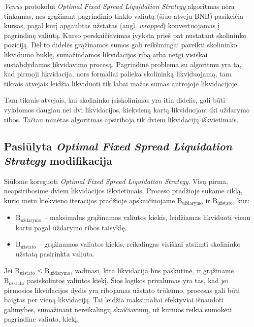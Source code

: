 \documentclass{VUMIFPSkursinis}
\begin{document}
\textit{Venus} protokolui \textit{Optimal Fixed Spread Liquidation Strategy} algoritmas nėra tinkamas, nes grąžinant pagrindinio tinklo valiutą (šiuo atveju BNB) pasikeičia kursas, pagal kurį apgaubtas užstatas (angl. \textit{wrapped}) konvertuojamas į pagrindinę valiutą. Kurso perskaičiavimas įvyksta prieš pat nustatant skolininko poziciją. Dėl to didelės grąžinamos sumos gali reikšmingai paveikti skolininko likvidumo būklę, sumažindamos likvidacijos ribą arba netgi visiškai sustabdydamos likvidavimo procesą. Pagrindinė problema su algoritmu yra ta, kad pirmoji likvidacija, nors formaliai palieka skolininką likviduojamą, tam tikrais atvejais leidžia likviduoti tik labai mažas sumas antrojoje likvidacijoje.

Tam tikrais atvejais, kai skolininko įsiskolinimas yra itin didelis, gali būti vykdomos daugiau nei dvi likvidacijos, kiekvieną kartą likviduojant iki uždarymo ribos. Tačiau minėtas algoritmas apsiriboja tik dviem likvidacijų iškvietimais.

\subsection{Pasiūlyta \textit{Optimal Fixed Spread Liquidation Strategy} modifikacija}

Siūlome koreguoti \textit{Optimal Fixed Spread Liquidation Strategy}. Visų pirma, neapsiribosime dviem likvidacijos iškvietimais. Proceso pradžioje sukame ciklą, kurio metu kiekvieno iteracijos pradžioje apskaičiuojame $\text{B}_{\text{uždarymo}}$ ir $\text{B}_{\text{užstato}}$, kur:

\begin{itemize}
\item $\text{B}_{\text{uždarymo}}$ – maksimalus grąžinamos valiutos kiekis, leidžiamas likviduoti vienu kartu pagal uždarymo ribos taisyklę.
\item $\text{B}_{\text{užstato}}$ – grąžinamos valiutos kiekis, reikalingas visiškai atsiimti skolininko užstatą pasirinkta valiuta.
\end{itemize}

Jei $\text{B}_{\text{užstato}} \leq \text{B}_{\text{uždarymo}}$, vadinasi, kita likvidacija bus paskutinė, ir grąžiname $\text{B}_{\text{užstato}}$ pasiskolintos valiutos kiekį. Šios logikos privalumas yra tas, kad jei pirmosios likvidacijos dydis yra ribojamas užstato trūkumo, procesas gali būti baigtas per vieną likvidaciją. Tai leidžia maksimaliai efektyviai išnaudoti galimybes, sumažinant nereikalingų skaičiavimų, už kuriuos reikia sumokėti pagrindine valiuta, kiekį.
\end{document}
